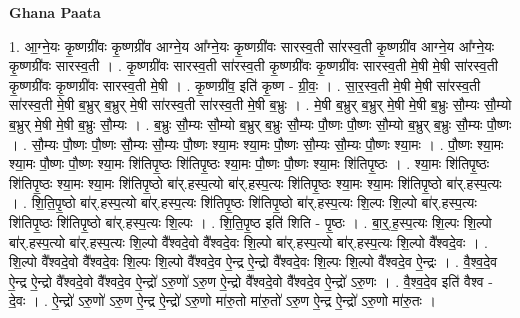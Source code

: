 \documentclass[17pt]{extarticle}
\begin{document}
\textbf{Ghana Paata } \newline

1. आ॒ग्ने॒यः कृ॒ष्णग्री॑वः कृ॒ष्णग्री॑व आग्ने॒य आ᳚ग्ने॒यः कृ॒ष्णग्री॑वः सारस्व॒ती सा॑रस्व॒ती कृ॒ष्णग्री॑व आग्ने॒य आ᳚ग्ने॒यः कृ॒ष्णग्री॑वः सारस्व॒ती । . कृ॒ष्णग्री॑वः सारस्व॒ती सा॑रस्व॒ती कृ॒ष्णग्री॑वः कृ॒ष्णग्री॑वः सारस्व॒ती मे॒षी मे॒षी सा॑रस्व॒ती कृ॒ष्णग्री॑वः कृ॒ष्णग्री॑वः सारस्व॒ती मे॒षी । . कृ॒ष्णग्री॑व॒ इति॑ कृ॒ष्ण - ग्री॒वः॒ । . सा॒र॒स्व॒ती मे॒षी मे॒षी सा॑रस्व॒ती सा॑रस्व॒ती मे॒षी ब॒भ्रुर् ब॒भ्रुर् मे॒षी सा॑रस्व॒ती सा॑रस्व॒ती मे॒षी ब॒भ्रुः । . मे॒षी ब॒भ्रुर् ब॒भ्रुर् मे॒षी मे॒षी ब॒भ्रुः सौ॒म्यः सौ॒म्यो ब॒भ्रुर् मे॒षी मे॒षी ब॒भ्रुः सौ॒म्यः । . ब॒भ्रुः सौ॒म्यः सौ॒म्यो ब॒भ्रुर् ब॒भ्रुः सौ॒म्यः पौ॒ष्णः पौ॒ष्णः सौ॒म्यो ब॒भ्रुर् ब॒भ्रुः सौ॒म्यः पौ॒ष्णः । . सौ॒म्यः पौ॒ष्णः पौ॒ष्णः सौ॒म्यः सौ॒म्यः पौ॒ष्णः श्या॒मः श्या॒मः पौ॒ष्णः सौ॒म्यः सौ॒म्यः पौ॒ष्णः श्या॒मः । . पौ॒ष्णः श्या॒मः श्या॒मः पौ॒ष्णः पौ॒ष्णः श्या॒मः शि॑तिपृ॒ष्ठः शि॑तिपृ॒ष्ठः श्या॒मः पौ॒ष्णः पौ॒ष्णः श्या॒मः शि॑तिपृ॒ष्ठः । . श्या॒मः शि॑तिपृ॒ष्ठः शि॑तिपृ॒ष्ठः श्या॒मः श्या॒मः शि॑तिपृ॒ष्ठो बा॑र्.हस्प॒त्यो बा॑र्.हस्प॒त्यः शि॑तिपृ॒ष्ठः श्या॒मः श्या॒मः शि॑तिपृ॒ष्ठो बा॑र्.हस्प॒त्यः । . शि॒ति॒पृ॒ष्ठो बा॑र्.हस्प॒त्यो बा॑र्.हस्प॒त्यः शि॑तिपृ॒ष्ठः शि॑तिपृ॒ष्ठो बा॑र्.हस्प॒त्यः शि॒ल्पः शि॒ल्पो बा॑र्.हस्प॒त्यः शि॑तिपृ॒ष्ठः शि॑तिपृ॒ष्ठो बा॑र्.हस्प॒त्यः शि॒ल्पः । . शि॒ति॒पृ॒ष्ठ इति॑ शिति - पृ॒ष्ठः । . बा॒र्॒.ह॒स्प॒त्यः शि॒ल्पः शि॒ल्पो बा॑र्.हस्प॒त्यो बा॑र्.हस्प॒त्यः शि॒ल्पो वै᳚श्वदे॒वो वै᳚श्वदे॒वः शि॒ल्पो बा॑र्.हस्प॒त्यो बा॑र्.हस्प॒त्यः शि॒ल्पो वै᳚श्वदे॒वः । . शि॒ल्पो वै᳚श्वदे॒वो वै᳚श्वदे॒वः शि॒ल्पः शि॒ल्पो वै᳚श्वदे॒व ऐ॒न्द्र ऐ॒न्द्रो वै᳚श्वदे॒वः शि॒ल्पः शि॒ल्पो वै᳚श्वदे॒व ऐ॒न्द्रः । . वै॒श्व॒दे॒व ऐ॒न्द्र ऐ॒न्द्रो वै᳚श्वदे॒वो वै᳚श्वदे॒व ऐ॒न्द्रो॑ ऽरु॒णो॑ ऽरु॒ण ऐ॒न्द्रो वै᳚श्वदे॒वो वै᳚श्वदे॒व ऐ॒न्द्रो॑ ऽरु॒णः । . वै॒श्व॒दे॒व इति॑ वैश्व - दे॒वः । . ऐ॒न्द्रो॑ ऽरु॒णो॑ ऽरु॒ण ऐ॒न्द्र ऐ॒न्द्रो॑ ऽरु॒णो मा॑रु॒तो मा॑रु॒तो॑ ऽरु॒ण ऐ॒न्द्र ऐ॒न्द्रो॑ ऽरु॒णो मा॑रु॒तः । \newline
\end{document}
